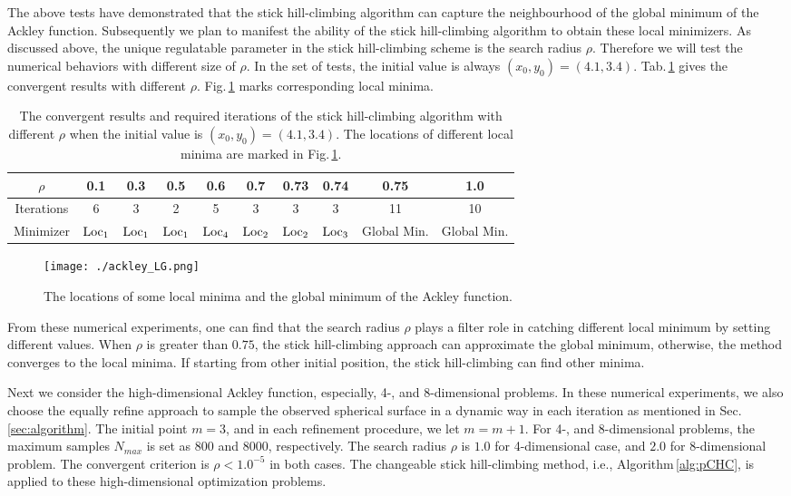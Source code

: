 \documentclass[mathpazo]{aamm}
\begin{document}
The above tests have demonstrated that the stick hill-climbing
algorithm can capture the neighbourhood of the global minimum of
the Ackley function. 
Subsequently we plan to manifest the ability of the stick
hill-climbing algorithm to obtain these local minimizers.
As discussed above, the unique regulatable parameter in the stick
hill-climbing scheme is the search radius $\rho$. Therefore we
will test the numerical behaviors with different size of $\rho$.
In the set of tests, the initial value is always $(x_0, y_0)=(4.1,3.4)$.
Tab.\,\ref{tab:ackley:r} gives the convergent results with
different $\rho$. Fig.\,\ref{fig:ackley:LG} marks
corresponding local minima.
\begin{table}[!htbp]
\caption{\label{tab:ackley:r}The convergent results and required
iterations of the stick hill-climbing algorithm with different
$\rho$ when the
initial value is $(x_0, y_0)=(4.1, 3.4)$. The locations of
different local minima are marked in Fig.\,\ref{fig:ackley:LG}.}
\begin{center}
	\footnotesize{
\begin{tabular}{|c|c|c|c|c|c|c|c|c|c|}
 \hline
 $\rho$ & 0.1 & 0.3 & 0.5 & 0.6 & 0.7 & 0.73 & 0.74 & 0.75 & 1.0
 \\\hline
 Iterations & 6   & 3   &  2  & 5   & 3   & 3    & 3    & 11   & 10
 \\\hline
 Minimizer & $\rm{Loc_1}$ & $\rm{Loc_1}$ & $\rm{Loc_1}$ &
 $\rm{Loc_4}$ & $\rm{Loc_2}$ & $\rm{Loc_2}$  &
 $\rm{Loc_3}$ & Global Min. & Global Min. 
 \\\hline
\end{tabular}
 }
\end{center}
\end{table}
\normalsize
\begin{figure}[!htbp]
	\centering
	  \texttt{[image: ./ackley\_LG.png]}
	  \caption{The locations of some local minima and the global
	  minimum of the Ackley function.}
\label{fig:ackley:LG}
\end{figure}
From these numerical experiments, one can find that the search
radius $\rho$ plays a filter role in
catching different local minimum by setting different values. 
When $\rho$ is greater than $0.75$, the stick hill-climbing
approach can approximate the global minimum, otherwise, the
method converges to the local minima. If starting from other
initial position, the stick hill-climbing can find other minima.

Next we consider the high-dimensional Ackley function, especially, 4-,
and 8-dimensional problems. In these numerical experiments, we
also choose the equally refine approach to sample the observed
spherical surface in a dynamic way in each iteration as mentioned
in Sec.\,\ref{sec:algorithm}.
The initial point $m=3$, and in each refinement procedure, we let
$m=m+1$. For 4-, and 8-dimensional problems, the maximum
samples $N_{max}$ is set as $800$ and $8000$,
respectively. The search radius $\rho$ is $1.0$ for 4-dimensional case, 
and $2.0$ for $8$-dimensional problem.
The convergent criterion is $\rho<1.0^{-5}$ in both cases.
The changeable stick hill-climbing method, i.e., 
Algorithm\,\ref{alg:pCHC}, is applied 
to these high-dimensional optimization problems. 
\end{document}
